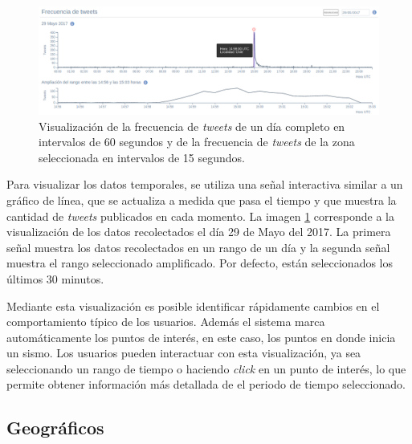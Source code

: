	\begin{figure}[ht]
	  \centering
	  \includegraphics[trim={0 0 0 0}, clip, width=\textwidth]{imagenes/linea_de_tiempo_interactive.png}
	  \caption{Visualización de la frecuencia de \textit{tweets} de un día completo en intervalos de 60 segundos y de la frecuencia de \textit{tweets} de la zona seleccionada en intervalos de 15 segundos.}
	\label{fig:timeline}
	\end{figure}
		
	
	Para visualizar los datos temporales, se utiliza una señal interactiva similar a un gráfico de línea, que se actualiza a medida que pasa el tiempo y que muestra la cantidad de \textit{tweets} publicados en cada momento.
	La imagen \ref{fig:timeline} corresponde a la visualización de los datos recolectados el día 29 de Mayo del 2017.
	La primera señal muestra los datos recolectados en un rango de un día y la segunda señal muestra el rango seleccionado amplificado. Por defecto, están seleccionados los últimos 30 minutos.
		
	Mediante esta visualización es posible identificar rápidamente cambios en el comportamiento típico de los usuarios.
	Además el sistema marca automáticamente los puntos de interés, en este caso, los puntos en donde inicia un sismo. 
	Los usuarios pueden interactuar con esta visualización, ya sea seleccionando un rango de tiempo o haciendo \textit{click} en un punto de interés, lo que permite obtener información más detallada de el periodo de tiempo seleccionado. 
	
	
	\subsection{Geográficos}
	
